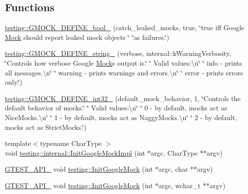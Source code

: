 \subsection*{Functions}
\begin{DoxyCompactItemize}
\item 
\mbox{\hyperlink{namespacetesting_aca5af0e8943ba53352537ab84233b47f}{testing\+::\+G\+M\+O\+C\+K\+\_\+\+D\+E\+F\+I\+N\+E\+\_\+bool\+\_\+}} (catch\+\_\+leaked\+\_\+mocks, true, \char`\"{}true iff Google \mbox{\hyperlink{class_mock}{Mock}} should report leaked mock objects \char`\"{} \char`\"{}as failures.\char`\"{})
\item 
\mbox{\hyperlink{namespacetesting_a92ea84a47432512152022ef73176676f}{testing\+::\+G\+M\+O\+C\+K\+\_\+\+D\+E\+F\+I\+N\+E\+\_\+string\+\_\+}} (verbose, internal\+::k\+Warning\+Verbosity, \char`\"{}Controls how verbose Google \mbox{\hyperlink{class_mock}{Mock}}\textquotesingle{}s output is.\char`\"{} \char`\"{}  Valid values\+:\textbackslash{}n\char`\"{} \char`\"{}  info    -\/ prints all messages.\textbackslash{}n\char`\"{} \char`\"{}  warning -\/ prints warnings and errors.\textbackslash{}n\char`\"{} \char`\"{}  error   -\/ prints errors only.\char`\"{})
\item 
\mbox{\hyperlink{namespacetesting_a211b4be008f5b4cccee486a262d91a52}{testing\+::\+G\+M\+O\+C\+K\+\_\+\+D\+E\+F\+I\+N\+E\+\_\+int32\+\_\+}} (default\+\_\+mock\+\_\+behavior, 1, \char`\"{}Controls the default behavior of mocks.\char`\"{} \char`\"{}  Valid values\+:\textbackslash{}n\char`\"{} \char`\"{}  0 -\/ by default, mocks act as Nice\+Mocks.\textbackslash{}n\char`\"{} \char`\"{}  1 -\/ by default, mocks act as Naggy\+Mocks.\textbackslash{}n\char`\"{} \char`\"{}  2 -\/ by default, mocks act as Strict\+Mocks.\char`\"{})
\item 
{\footnotesize template$<$typename Char\+Type $>$ }\\void \mbox{\hyperlink{namespacetesting_1_1internal_a3823844199df88af9493026031cf7744}{testing\+::internal\+::\+Init\+Google\+Mock\+Impl}} (int $\ast$argc, Char\+Type $\ast$$\ast$argv)
\item 
\mbox{\hyperlink{_obj__test_2lib_2googletest-release-1_88_81_2googletest_2include_2gtest_2internal_2gtest-port_8h_aa73be6f0ba4a7456180a94904ce17790}{G\+T\+E\+S\+T\+\_\+\+A\+P\+I\+\_\+}} void \mbox{\hyperlink{namespacetesting_a32b1c6db9ba5133ccabfa67616b3c041}{testing\+::\+Init\+Google\+Mock}} (int $\ast$argc, char $\ast$$\ast$argv)
\item 
\mbox{\hyperlink{_obj__test_2lib_2googletest-release-1_88_81_2googletest_2include_2gtest_2internal_2gtest-port_8h_aa73be6f0ba4a7456180a94904ce17790}{G\+T\+E\+S\+T\+\_\+\+A\+P\+I\+\_\+}} void \mbox{\hyperlink{namespacetesting_a20fb86152763dddef67bc1dd8b090800}{testing\+::\+Init\+Google\+Mock}} (int $\ast$argc, wchar\+\_\+t $\ast$$\ast$argv)
\end{DoxyCompactItemize}
